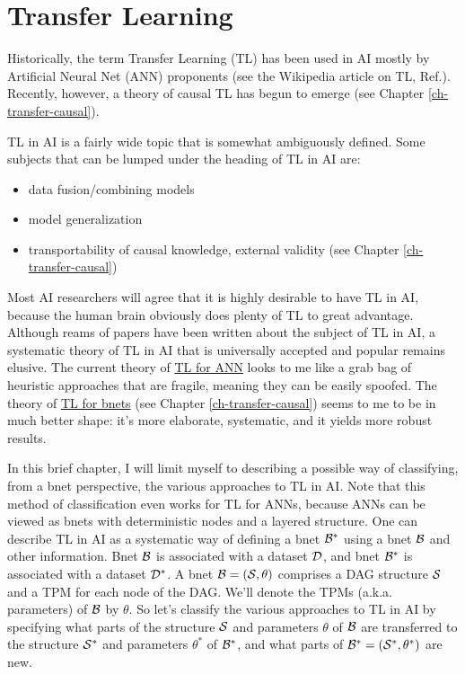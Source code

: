 \chapter{Transfer Learning}
\label{ch-transfer}

Historically,
the term Transfer Learning (TL)
has been used in AI mostly by Artificial Neural Net (ANN)
proponents (see the Wikipedia article on TL,
 Ref.\cite{wiki-TL}).
Recently, however,
 a theory of causal TL
has begun to emerge
(see Chapter \ref{ch-transfer-causal}).

TL in AI is a
fairly wide topic that 
is somewhat ambiguously defined.
Some subjects that can be lumped
under the heading of TL in AI are:
\begin{itemize}
\item data fusion/combining models
\item model generalization
\item transportability of 
causal knowledge, external validity
(see Chapter \ref{ch-transfer-causal})
\end{itemize}


Most AI researchers
will agree that it is highly desirable 
to have TL in AI, because the human 
brain obviously does  plenty of TL
to great advantage.
Although reams of papers 
have been written about the subject of TL in AI,
a systematic theory of TL in AI
that is universally accepted and popular
remains elusive. The current
theory of \ul{TL for ANN} looks to me 
like a grab bag
of
 heuristic approaches
that are fragile, meaning they
can be easily spoofed.
The theory of \ul{TL for bnets} (see
Chapter \ref{ch-transfer-causal})
seems to me to be in much 
better shape: it's more
elaborate,
systematic, and it
yields more robust results.



In this brief chapter, I will
limit myself to describing a possible way of
 classifying,
from a bnet perspective, the 
various approaches to TL
in AI.
Note that this method of classification
even works for TL for ANNs,
because ANNs can be
viewed as bnets with deterministic nodes
and a layered structure.
One can describe TL in AI as 
a systematic way 
of  defining a bnet 
${\cal B}^*$ 
using a bnet 
${\cal B}$
and other information.
Bnet ${\cal B}$ is associated with a dataset ${\cal D}$,
and bnet ${\cal B}^*$
is associated with a dataset ${\cal D}^*$.
A bnet ${\cal B}=({\cal S}, \theta)$ comprises
a DAG structure ${\cal S}$ and 
a TPM for each node of the DAG. We'll denote
the TPMs (a.k.a. parameters) of ${\cal B}$ by $\theta$. So let's
classify the various approaches to TL in AI 
by specifying what parts
of the structure ${\cal S}$ and parameters $\theta$
of ${\cal B}$
are transferred to the structure
${\cal S}^*$ and parameters $\theta^*$
of ${\cal B}^*$, and what parts of 
${\cal B}^*=({\cal S}^*, \theta^*)$ are new.

